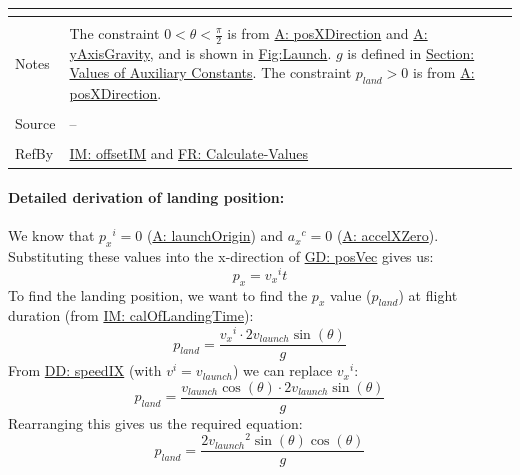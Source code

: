 \documentclass[12pt]{article}
\begin{document}
\begin{minipage}{\textwidth}
\begin{tabular}{>{\raggedright}p{}>{\raggedright\arraybackslash}p{}}
\begin{symbDescription}
                        \end{symbDescription}
          \\ \midrule \\
          Notes & The constraint $0<θ<\frac{π}{2}$ is from \hyperref[posXDirection]{A: posXDirection} and \hyperref[yAxisGravity]{A: yAxisGravity}, and is shown in \hyperref[Figure:Launch]{Fig:Launch}.
                  $g$ is defined in \hyperref[Sec:AuxConstants]{Section: Values of Auxiliary Constants}.
                  The constraint ${p_{land}}>0$ is from \hyperref[posXDirection]{A: posXDirection}.
          \\ \midrule \\
          Source & --
          \\ \midrule \\
          RefBy & \hyperref[IM:offsetIM]{IM: offsetIM} and \hyperref[calcValues]{FR: Calculate-Values}
          \\ \bottomrule
          \end{tabular}
          \end{minipage}
\paragraph{Detailed derivation of landing position:}
\label{IM:calOfLandingDistDeriv}
We know that ${{p_{x}}^{i}}=0$ (\hyperref[launchOrigin]{A: launchOrigin}) and ${{a_{x}}^{c}}=0$ (\hyperref[accelXZero]{A: accelXZero}). Substituting these values into the x-direction of \hyperref[GD:posVec]{GD: posVec} gives us:
\begin{displaymath}
{p_{x}}={{v_{x}}^{i}} t
\end{displaymath}
To find the landing position, we want to find the ${p_{x}}$ value (${p_{land}}$) at flight duration (from \hyperref[IM:calOfLandingTime]{IM: calOfLandingTime}):
\begin{displaymath}
{p_{land}}=\frac{{{v_{x}}^{i}}\cdot{}2 {v_{launch}} \sin\left(θ\right)}{g}
\end{displaymath}
From \hyperref[DD:speedIX]{DD: speedIX} (with ${v^{i}}={v_{launch}}$) we can replace ${{v_{x}}^{i}}$:
\begin{displaymath}
{p_{land}}=\frac{{v_{launch}} \cos\left(θ\right)\cdot{}2 {v_{launch}} \sin\left(θ\right)}{g}
\end{displaymath}
Rearranging this gives us the required equation:
\begin{displaymath}
{p_{land}}=\frac{2 {v_{launch}}^{2} \sin\left(θ\right) \cos\left(θ\right)}{g}
\end{displaymath}
\par~
\end{document}
